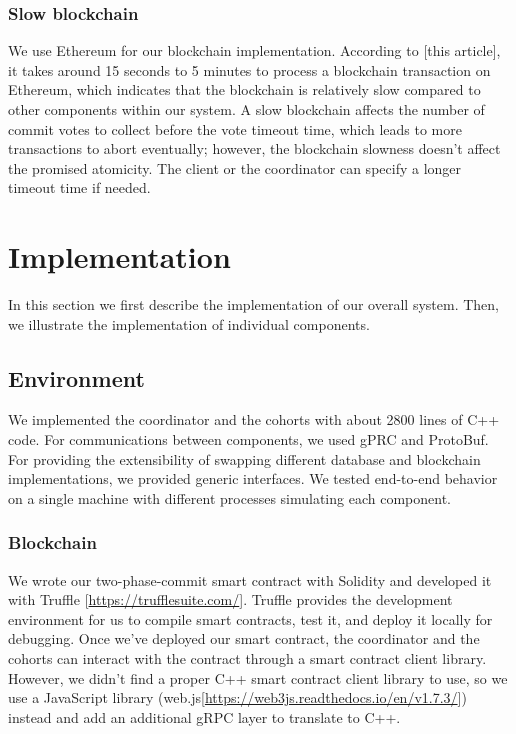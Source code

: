 \documentclass[11pt,conference]{IEEEtran}
\begin{document}
\subsubsection{Slow blockchain}
We use Ethereum for our blockchain implementation. According to [this article], it takes around 15 seconds to 5 minutes to process a blockchain transaction on Ethereum, which indicates that the blockchain is relatively slow compared to other components within our system. A slow blockchain affects the number of commit votes to collect before the vote timeout time, which leads to more transactions to abort eventually; however, the blockchain slowness doesn’t affect the promised atomicity. The client or the coordinator can specify a longer timeout time if needed.


\section{Implementation}
In this section we first describe the implementation of our overall system. Then, we illustrate the implementation of individual components.

\subsection{Environment}
We implemented the coordinator and the cohorts with about 2800 lines of C++ code. For communications between components, we used gPRC and ProtoBuf. For providing the extensibility of swapping different database and blockchain implementations, we provided generic interfaces. We tested end-to-end behavior on a single machine with different processes simulating each component.

\subsubsection{Blockchain}
We wrote our two-phase-commit smart contract with Solidity and developed it with Truffle [\url{https://trufflesuite.com/}]. Truffle provides the development environment for us to compile smart contracts, test it, and deploy it locally for debugging. Once we’ve deployed our smart contract, the coordinator and the cohorts can interact with the contract through a smart contract client library. However, we didn’t find a proper C++ smart contract client library to use, so we use a JavaScript library (web.js[\url{https://web3js.readthedocs.io/en/v1.7.3/}]) instead and add an additional gRPC layer to translate to C++.
\end{document}
